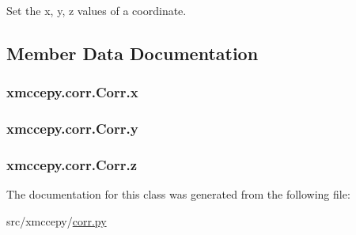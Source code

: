 Set the x, y, z values of a coordinate. 



\subsection{Member Data Documentation}
\hypertarget{classxmccepy_1_1corr_1_1_corr_af92bf6894f8092d64bebdd641fba09f7}{
\subsubsection[{x}]{\setlength{\rightskip}{0pt plus 5cm}xmccepy.\-corr.\-Corr.\-x}}\label{classxmccepy_1_1corr_1_1_corr_af92bf6894f8092d64bebdd641fba09f7}
\hypertarget{classxmccepy_1_1corr_1_1_corr_a6a9298c2b8c4747dbd514dcde6b4e98d}{
\subsubsection[{y}]{\setlength{\rightskip}{0pt plus 5cm}xmccepy.\-corr.\-Corr.\-y}}\label{classxmccepy_1_1corr_1_1_corr_a6a9298c2b8c4747dbd514dcde6b4e98d}
\hypertarget{classxmccepy_1_1corr_1_1_corr_af4b31d22cd5524607542063be5b86a82}{
\subsubsection[{z}]{\setlength{\rightskip}{0pt plus 5cm}xmccepy.\-corr.\-Corr.\-z}}\label{classxmccepy_1_1corr_1_1_corr_af4b31d22cd5524607542063be5b86a82}


The documentation for this class was generated from the following file\-:\begin{DoxyCompactItemize}
\item 
src/xmccepy/\hyperlink{corr_8py}{corr.\-py}\end{DoxyCompactItemize}
